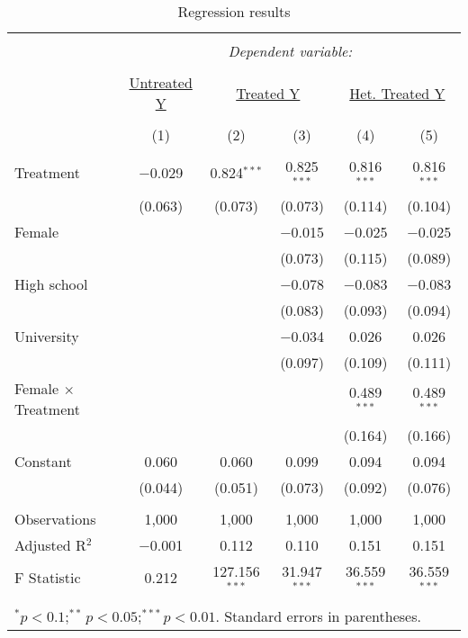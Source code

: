 \documentclass[11pt, a4paper]{article}\usepackage[]{graphicx}\usepackage[]{color}
\begin{document}
\begin{table}[!htbp] \centering 
  \caption{Regression results} 
  \label{} 
\begin{tabular}{@{\extracolsep{5pt}}lccccc} 
\\[-1.8ex]\hline 
\hline \\[-1.8ex] 
 & \multicolumn{5}{c}{\textit{Dependent variable:}} \\ 
\cline{2-6} 
\\[-1.8ex] & \underline{Untreated Y} & \multicolumn{2}{c}{\underline{Treated Y}} & \multicolumn{2}{c}{\underline{Het. Treated Y}} \\ 
\\[-1.8ex] & (1) & (2) & (3) & (4) & (5)\\ 
\hline \\[-1.8ex] 
 Treatment & $-$0.029 & 0.824$^{***}$ & 0.825$^{***}$ & 0.816$^{***}$ & 0.816$^{***}$ \\ 
  & (0.063) & (0.073) & (0.073) & (0.114) & (0.104) \\ 
  Female &  &  & $-$0.015 & $-$0.025 & $-$0.025 \\ 
  &  &  & (0.073) & (0.115) & (0.089) \\ 
  High school &  &  & $-$0.078 & $-$0.083 & $-$0.083 \\ 
  &  &  & (0.083) & (0.093) & (0.094) \\ 
  University &  &  & $-$0.034 & 0.026 & 0.026 \\ 
  &  &  & (0.097) & (0.109) & (0.111) \\ 
  Female $\times$ Treatment &  &  &  & 0.489$^{***}$ & 0.489$^{***}$ \\ 
  &  &  &  & (0.164) & (0.166) \\ 
  Constant & 0.060 & 0.060 & 0.099 & 0.094 & 0.094 \\ 
  & (0.044) & (0.051) & (0.073) & (0.092) & (0.076) \\ 
 \hline \\[-1.8ex] 
Observations & 1,000 & 1,000 & 1,000 & 1,000 & 1,000 \\ 
Adjusted R$^{2}$ & $-$0.001 & 0.112 & 0.110 & 0.151 & 0.151 \\ 
F Statistic & 0.212 & 127.156$^{***}$ & 31.947$^{***}$ & 36.559$^{***}$ & 36.559$^{***}$ \\ 
\hline 
\hline \\[-1.8ex] 
\multicolumn{6}{l}{\parbox[t]{10cm}{$^{*}p<0.1;^{**}p<0.05;^{***}p<0.01$. Standard errors in parentheses.}} \\ 
\end{tabular} 
\end{table} 
\end{document}
